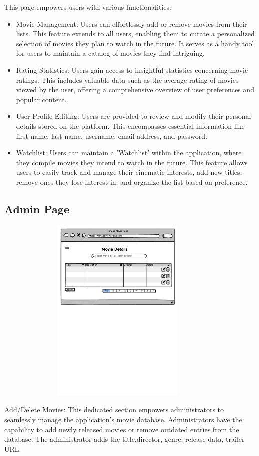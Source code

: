 This page empowers users with various functionalities: 
\begin{itemize}
\item  Movie Management: Users can effortlessly add or remove movies from their lists. This feature extends to all users, enabling them to curate a personalized selection of movies they plan to watch in the future. It serves as a handy tool for users to maintain a catalog of movies they find intriguing.
\item  Rating Statistics: Users gain access to insightful statistics concerning movie ratings. This includes valuable data such as the average rating of movies viewed by the user, offering a comprehensive overview of user preferences and popular content.
\item  User Profile Editing: Users are provided  to review and modify their personal details stored on the platform. This encompasses essential information like first name, last name, username, email address, and password. 
\item  Watchlist: Users can maintain a 'Watchlist' within the application, where they compile movies they intend to watch in the future. This feature allows users to easily track and manage their cinematic interests, add new titles, remove ones they lose interest in, and organize the list based on preference. 
\end{itemize}

\subsection{Admin Page}

\begin{center}
\includegraphics[width=12cm, height=9cm]{pictures/AdminPage.pdf}
\end{center}
Add/Delete Movies: This dedicated section empowers administrators to seamlessly manage the application's movie database. Administrators have the capability to add newly released movies or remove outdated entries from the database. The administrator adds the title,director, genre, release data, trailer URL.

